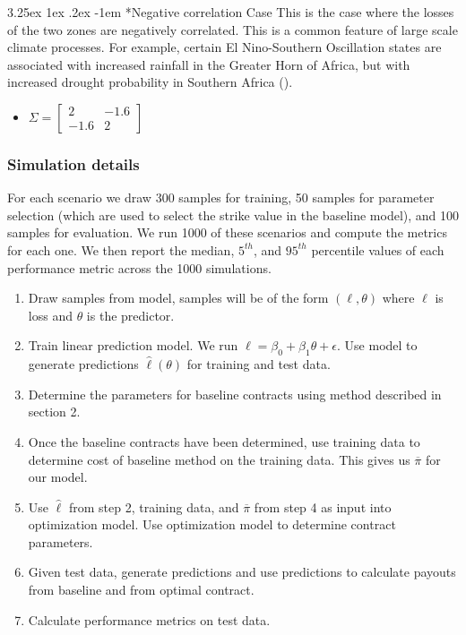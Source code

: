 \documentclass[11pt]{article}
\makeatletter
\renewcommand\paragraph{\@startsection{paragraph}{5}{\z@}%
  {3.25ex \@plus1ex \@minus.2ex}%
  {-1em}%
  {\normalfont\normalsize\bfseries}}
\makeatother
\begin{document}
      \paragraph*{Negative correlation Case}
        This is the case where the losses of the two zones are negatively correlated. This is a common feature of large scale climate processes. For example, certain El Nino-Southern Oscillation states are associated with increased rainfall in the Greater Horn of Africa, but with increased drought probability in Southern Africa (\cite{barrett2007poverty}). 
        \begin{itemize}
            \item $\Sigma = \begin{bmatrix}
                2 & -1.6 \\
                -1.6 & 2 
                \end{bmatrix} $
        \end{itemize}

    \subsubsection{Simulation details}
        For each scenario we draw 300 samples for training, 50 samples for parameter selection (which are used to select the strike value in the baseline model), and 100 samples for evaluation. We run 1000 of these scenarios and compute the metrics for each one. We then report the median, $5^{th}$, and $95^{th}$ percentile values of each performance metric across the 1000 simulations. 
        \begin{enumerate}
        \item Draw samples from model, samples will be of the form $(\ell,\theta)$ where $\ell$ is loss and $\theta$ is the predictor. 
        \item Train linear prediction model. We run $\ell = \beta_0 + \beta_1\theta +\epsilon$. Use model to generate predictions $\hat{\ell}(\theta)$ for training and test data. 
        \item Determine the parameters for baseline contracts using method described in section 2. 
        \item Once the baseline contracts have been determined, use training data to determine cost of baseline method on the training data. This gives us $\overline{\pi}$ for our model. 
        \item Use $\hat{\ell}$ from step 2, training data, and $\overline{\pi}$ from step 4 as input into optimization model. Use optimization  model to determine contract parameters. 
        \item Given test data, generate predictions and use predictions to calculate payouts from baseline and from optimal contract. 
        \item Calculate performance metrics on test data. 
        \end{enumerate}
\end{document}
